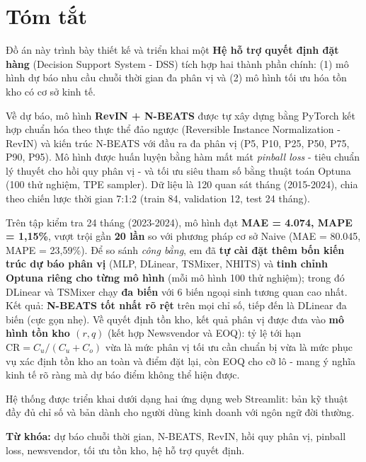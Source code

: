 \documentclass[12pt, a4paper]{report}
\newcommand{\CR}{\ensuremath{\mathrm{CR}}}
\newcommand{\Cu}{\ensuremath{C_u}}
\newcommand{\Co}{\ensuremath{C_o}}
\begin{document}

\chapter*{Tóm tắt}

Đồ án này trình bày thiết kế và triển khai một \textbf{Hệ hỗ trợ quyết định đặt hàng} (Decision Support System - DSS) tích hợp hai thành phần chính: (1) mô hình dự báo nhu cầu chuỗi thời gian đa phân vị và (2) mô hình tối ưu hóa tồn kho có cơ sở kinh tế.

Về dự báo, mô hình \textbf{RevIN + N-BEATS} được tự xây dựng bằng PyTorch kết hợp chuẩn hóa theo thực thể đảo ngược (Reversible Instance Normalization - RevIN) và kiến trúc N-BEATS với đầu ra đa phân vị (P5, P10, P25, P50, P75, P90, P95). Mô hình được huấn luyện bằng hàm mất mát \textit{pinball loss} - tiêu chuẩn lý thuyết cho hồi quy phân vị - và tối ưu siêu tham số bằng thuật toán Optuna (100 thử nghiệm, TPE sampler). Dữ liệu là 120 quan sát tháng (2015-2024), chia theo chiến lược thời gian 7:1:2 (train 84, validation 12, test 24 tháng).

Trên tập kiểm tra 24 tháng (2023-2024), mô hình đạt \textbf{MAE = 4.074, MAPE = 1,15\%}, vượt trội gần \textbf{20 lần} so với phương pháp cơ sở Naive (MAE = 80.045, MAPE = 23,59\%). Để so sánh \textit{công bằng}, em đã \textbf{tự cài đặt thêm bốn kiến trúc dự báo phân vị} (MLP, DLinear, TSMixer, NHITS) và \textbf{tinh chỉnh Optuna riêng cho từng mô hình} (mỗi mô hình 100 thử nghiệm); trong đó DLinear và TSMixer chạy \textbf{đa biến} với 6 biến ngoại sinh tương quan cao nhất. Kết quả: \textbf{N-BEATS tốt nhất rõ rệt} trên mọi chỉ số, tiếp đến là DLinear đa biến (cực gọn nhẹ). Về quyết định tồn kho, kết quả phân vị được đưa vào \textbf{mô hình tồn kho $(r,q)$} (kết hợp Newsvendor và EOQ): tỷ lệ tới hạn $\CR = \Cu/(\Cu + \Co)$ vừa là mức phân vị tối ưu cần chuẩn bị vừa là mức phục vụ xác định tồn kho an toàn và điểm đặt lại, còn EOQ cho cỡ lô - mang ý nghĩa kinh tế rõ ràng mà dự báo điểm không thể hiện được.

Hệ thống được triển khai dưới dạng hai ứng dụng web Streamlit: bản kỹ thuật đầy đủ chỉ số và bản dành cho người dùng kinh doanh với ngôn ngữ đời thường.

\textbf{Từ khóa:} dự báo chuỗi thời gian, N-BEATS, RevIN, hồi quy phân vị, pinball loss, newsvendor, tối ưu tồn kho, hệ hỗ trợ quyết định.
\end{document}
